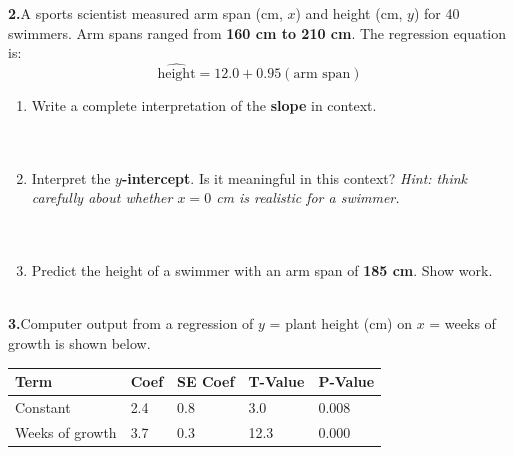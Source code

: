 \documentclass[10pt]{article}
\begin{document}
\vspace{0.18in}

\noindent\textbf{2.}\enspace A sports scientist measured arm span (cm, $x$) and height (cm,
$y$) for 40 swimmers. Arm spans ranged from \textbf{160 cm to 210 cm}. The regression
equation is:
\[
  \widehat{\text{height}} = 12.0 + 0.95(\text{arm span})
\]

\begin{enumerate}[label=\textbf{(\alph*)}, leftmargin=2em, itemsep=0.18in]

  \item Write a complete interpretation of the \textbf{slope} in context.\\[8pt]
        \writeline\\[3pt]\writeline\\[3pt]\writeline

  \item Interpret the \textbf{$y$-intercept}. Is it meaningful in this context?
        \textit{Hint: think carefully about whether $x = 0$ cm is realistic for a swimmer.}\\[8pt]
        \writeline\\[3pt]\writeline\\[3pt]\writeline

  \item Predict the height of a swimmer with an arm span of \textbf{185 cm}. Show work.\\[8pt]
        \writeline\\[3pt]\writeline

\end{enumerate}

\vspace{0.18in}

\noindent\textbf{3.}\enspace Computer output from a regression of $y$ = plant height (cm) on
$x$ = weeks of growth is shown below.

\vspace{8pt}
\renewcommand{\arraystretch}{1.4}
\begin{tabularx}{\linewidth}{@{} l X X X X @{}}
\rowcolor{sky}
\textbf{Term} & \textbf{Coef} & \textbf{SE Coef} & \textbf{T-Value} & \textbf{P-Value} \\
\midrule
Constant       & 2.4  & 0.8  & 3.0  & 0.008 \\
Weeks of growth & 3.7  & 0.3  & 12.3 & 0.000 \\
\end{tabularx}
\end{document}
